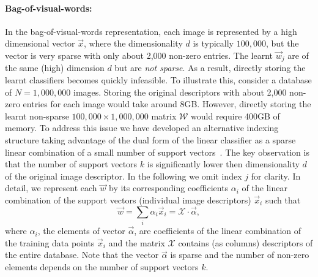  
  \paragraph{Bag-of-visual-words:}
    In the bag-of-visual-words representation, each image is represented by a high dimensional vector $\vec{x}$, where the dimensionality $d$ is typically $100,000$, but the vector is very sparse with only about 2,000 non-zero entries. 
    The learnt $\vec{w}_j$ are of the same (high) dimension $d$ but are {\em not sparse}. As a result, directly storing the learnt classifiers becomes quickly infeasible.
    To illustrate this, consider a database of $N=1,000,000$ images. Storing the original descriptors with about 2,000 non-zero entries for each image would take around 8GB. However, directly storing the learnt non-sparse $100,000\times 1,000,000 $ matrix $\mathcal{W}$ would require 400GB of memory. To address this issue we have developed an alternative indexing structure taking advantage of the dual form of the linear classifier as a sparse linear combination of a small number of support vectors~\cite{scholkopf2002learning}.   
    The key observation is that the number of support vectors $k$ is significantly lower then dimensionality $d$ of the original image descriptor. In the following we omit index $j$ for clarity.  In detail, we represent each $\vec{w}$ by its corresponding coefficients $\alpha_i$ of the linear combination of the support vectors (individual image descriptors) $\vec{x}_i$ such that
      \begin{equation}
        \vec{w}=\sum_{i} \alpha_i \vec{x}_i = \mathcal{X} \cdot \vec{\alpha},
        \label{eq:dual}
      \end{equation}
      \noindent
    where $\alpha_i$, the elements of vector $\vec{\alpha}$, are coefficients of the linear combination of the training data points $\vec{x}_i$ and the matrix $\mathcal{X}$ contains (as columns) descriptors of the entire database. Note that the vector $\vec{\alpha}$ is sparse and the number of non-zero elements depends on the number of support vectors $k$. 

